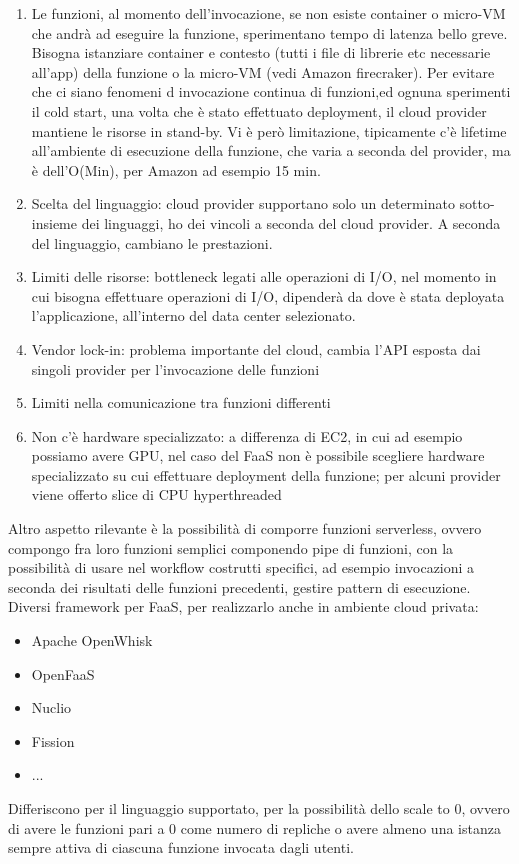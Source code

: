 \documentclass{article}
\begin{document}
\begin{enumerate}
\item Le funzioni, al momento dell'invocazione, se non esiste container o micro-VM che andrà ad eseguire la funzione, sperimentano tempo di latenza bello greve. Bisogna istanziare container e contesto (tutti i file di librerie etc necessarie all'app) della funzione o la micro-VM (vedi Amazon firecraker). Per evitare che ci siano fenomeni d invocazione continua di funzioni,ed ognuna sperimenti il cold start, una volta che è stato effettuato deployment, il cloud provider mantiene le risorse in stand-by. Vi è però limitazione, tipicamente c'è lifetime all'ambiente di esecuzione della funzione, che varia a seconda del provider, ma è dell'O(Min), per Amazon ad esempio 15 min.
\item Scelta del linguaggio: cloud provider supportano solo un determinato sotto-insieme dei linguaggi, ho dei vincoli a seconda del cloud provider. A seconda del linguaggio, cambiano le prestazioni.
\item Limiti delle risorse: bottleneck legati alle operazioni di I/O, nel momento in cui bisogna effettuare operazioni di I/O, dipenderà da dove è stata deployata l'applicazione, all'interno del data center selezionato.
\item Vendor lock-in: problema importante del cloud, cambia l'API esposta dai singoli provider per l'invocazione delle funzioni
\item Limiti nella comunicazione tra funzioni differenti
\item Non c'è hardware specializzato: a differenza di EC2, in cui ad esempio possiamo avere GPU, nel caso del FaaS non è possibile scegliere hardware specializzato su cui effettuare deployment della funzione; per alcuni provider viene offerto slice di CPU hyperthreaded
\end{enumerate}
Altro aspetto rilevante è la possibilità di comporre funzioni serverless, ovvero compongo fra loro funzioni semplici componendo pipe di funzioni, con la possibilità di usare nel workflow costrutti specifici, ad esempio invocazioni a seconda dei risultati delle funzioni precedenti, gestire pattern di esecuzione. Diversi framework per FaaS, per realizzarlo anche in ambiente cloud privata:
\begin{itemize}
\item Apache OpenWhisk
\item OpenFaaS
\item Nuclio
\item Fission
\item ...
\end{itemize}
Differiscono per il linguaggio supportato, per la possibilità dello scale to 0, ovvero di avere le funzioni pari a 0 come numero di repliche o avere almeno una istanza sempre attiva di ciascuna funzione invocata dagli utenti.
\end{document}
